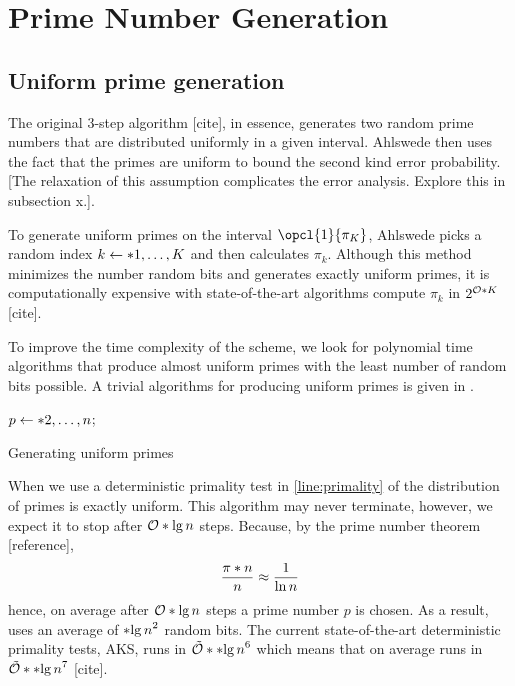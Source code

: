 \section{Prime Number Generation}
\subsection{Uniform prime generation}\label{subsec:unifprime}
The original 3-step algorithm [cite], in essence, generates two random prime numbers that are distributed uniformly in a given interval. Ahlswede then uses the fact that the primes are uniform to bound the second kind error probability. [The relaxation of this assumption complicates the error analysis. Explore this in subsection x.]. 

To generate uniform primes on the interval \(\opcl{1}{\pi_K}\), Ahlswede picks a random index \(k \gets \set{1, \dots, K}\) and then calculates \(\pi_k\). Although this method minimizes the number random bits and generates exactly uniform primes, it is computationally expensive with state-of-the-art algorithms compute \(\pi_k\) in \(2^{\bigO{K}}\)[cite]. 

To improve the time complexity of the scheme, we look for polynomial time algorithms that produce almost uniform primes with the least number of random bits possible. A trivial algorithms for producing uniform primes is given in .
\begin{algorithm}
	\DontPrintSemicolon
    {
        \(p \gets \set{2,\dots, n}\);
    }
	\caption{Generating uniform primes}
    \label{alg:trivialPNG}
\end{algorithm}

When we use a deterministic primality test in \cref{line:primality} of  the distribution of primes is exactly uniform. This algorithm may never terminate, however, we expect it to stop after \(\bigO{\lg n}\) steps. Because, by the prime number theorem [reference], 
\begin{equation}
    \dfrac{\func{\pi}{n}}{n} \approx \dfrac{1}{\ln n}
\end{equation}
hence, on average after \(\bigO{\lg n}\) steps a prime number \(p\) is chosen. As a result,  uses an average of \(\bracket{\lg n}^2\) random bits. The current state-of-the-art deterministic primality tests, AKS, runs in \(\logBigO{\bracket{\lg n}^6}\) which means that on average  runs in \(\logBigO{\bracket{\lg n}^7}\) [cite]. 

